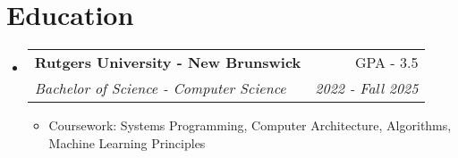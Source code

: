 \documentclass[letterpaper,10pt]{article}
\makeatletter
\newcommand{\resumeItem}[1]{
  \item\small{
    {#1 \vspace{-2pt}}
  }
}
\newcommand{\resumeSubheading}[4]{
  \vspace{-2pt}\item
    \begin{tabular*}{0.97\textwidth}[t]{l@{\extracolsep{\fill}}r}
      \textbf{#1} & #2 \\
      \textit{\small#3} & \textit{\small #4} \\
    \end{tabular*}\vspace{-7pt}
}
\newcommand{\resumeSubHeadingListStart}{\begin{itemize}[leftmargin=0.15in, label={}]}
\newcommand{\resumeSubHeadingListEnd}{\end{itemize}}
\newcommand{\resumeItemListStart}{\begin{itemize}}
\newcommand{\resumeItemListEnd}{\end{itemize}\vspace{-5pt}}
\makeatother
\begin{document}
\section{Education}
  \resumeSubHeadingListStart
    \resumeSubheading
      {Rutgers University - New Brunswick}{GPA - 3.5}
      {Bachelor of Science - Computer Science}{2022 - Fall 2025}
      \resumeItemListStart
        \resumeItem{Coursework: Systems Programming, Computer Architecture, Algorithms, Machine Learning Principles}
    \resumeItemListEnd
  \resumeSubHeadingListEnd
\end{document}

